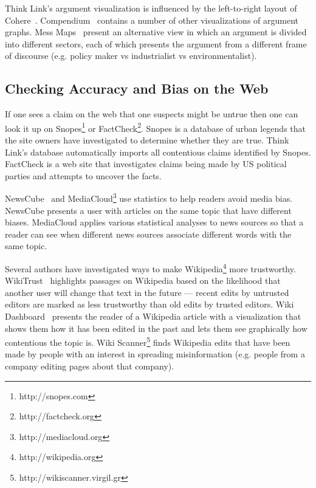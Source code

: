 \documentclass{chi2009}
\begin{document}
Think Link's argument visualization is influenced by the left-to-right layout of Cohere~\cite{Shum2008}. Compendium~\cite{Selvin2001} contains a number of other visualizations of argument graphs. Mess Maps~\cite{Horn2007} present an alternative view in which an argument is divided into different sectors, each of which presents the argument from a different frame of discourse (e.g. policy maker vs industrialist vs environmentalist).



\subsection{Checking Accuracy and Bias on the Web}

If one sees a claim on the web that one suspects might be untrue then one can look it up on Snopes\footnote{http://snopes.com} or FactCheck\footnote{http://factcheck.org}. 
Snopes is a database of urban legends that the site owners have investigated to determine whether they are true.  %
Think Link's database automatically imports all contentious claims identified by Snopes. %
FactCheck is a web site that investigates claims being made by US political parties and attempts to uncover the facts. 

NewsCube~\cite{Park2009} and MediaCloud\footnote{http://mediacloud.org} use statistics to help readers avoid media bias. NewsCube presents a user with articles on the same topic that have different biases. MediaCloud applies various statistical analyses to news sources so that a reader can see when different news sources associate different words with the same topic.

Several authors have investigated ways to make Wikipedia\footnote{http://wikipedia.org} more trustworthy. WikiTrust~\cite{Adler2008a} highlights passages on Wikipedia based on the likelihood that another user will change that text in the future --- recent edits by untrusted editors are marked as less trustworthy than old edits by trusted editors. Wiki Dashboard~\cite{Kittur2008} presents the reader of a Wikipedia article with a visualization that shows them how it has been edited in the past and lets them see graphically how contentious the topic is. Wiki Scanner\footnote{http://wikiscanner.virgil.gr} finds Wikipedia edits that have been made by people with an interest in spreading misinformation (e.g. people from a company editing pages about that company).

% 
% 
\end{document}
